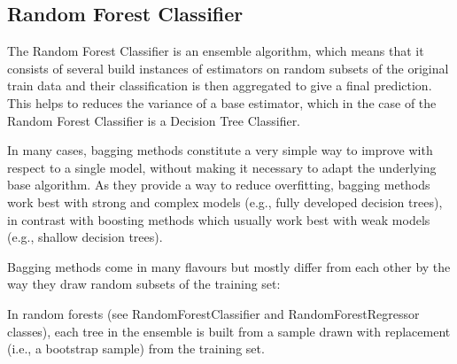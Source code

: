 \documentclass{article}
\begin{document}
\subsection{Random Forest Classifier}
The Random Forest Classifier is an ensemble algorithm, which means that it consists of several build instances of estimators on random subsets of the original train data and their classification is then aggregated to give a final prediction. This helps to reduces the variance of a base estimator, which in the case of the Random Forest Classifier is a Decision Tree Classifier.

In many cases, bagging methods constitute a very simple way to improve with respect to a single model, without making it necessary to adapt the underlying base algorithm. As they provide a way to reduce overfitting, bagging methods work best with strong and complex models (e.g., fully developed decision trees), in contrast with boosting methods which usually work best with weak models (e.g., shallow decision trees).

Bagging methods come in many flavours but mostly differ from each other by the way they draw random subsets of the training set:




In random forests (see RandomForestClassifier and RandomForestRegressor classes), each tree in the ensemble is built from a sample drawn with replacement (i.e., a bootstrap sample) from the training set.

\end{document}
